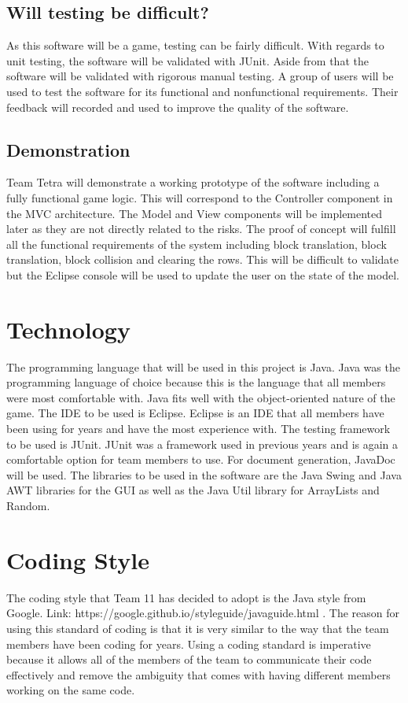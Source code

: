 \documentclass{article}
\begin{document}
\subsection{Will testing be difficult?}
As this software will be a game, testing can be fairly difficult. With regards to unit testing, the software will be validated with JUnit.  Aside from that the software will be validated with rigorous manual testing. A group of users will be used to test the software for its functional and nonfunctional requirements. Their feedback will recorded and used to improve the quality of the software.

\subsection{Demonstration}
Team Tetra will demonstrate a working prototype of the software including a fully functional game logic. This will correspond to the Controller component in the MVC architecture. The Model and View components will be implemented later as they are not directly related to the risks. The proof of concept will fulfill all the functional requirements of the system including block translation, block translation, block collision and clearing the rows. This will be difficult to validate but the Eclipse console will be used to update the user on the state of the model. 

\section{Technology}
The programming language that will be used in this project is Java. Java was the programming language of choice because this is the language that all members were most comfortable with. Java fits well with the object-oriented nature of the game. The IDE to be used is Eclipse. Eclipse is an IDE that all members have been using for  years and have the most experience with. The testing framework to be used is JUnit. JUnit was a framework used in previous years and is again a comfortable option for team members to use. For document generation, JavaDoc will be used. The libraries to be used in the software are the Java Swing and Java AWT libraries for the GUI as well as the Java Util library for ArrayLists and Random.
\section{Coding Style}
The coding style that Team 11 has decided to adopt is the Java style from Google. Link: https://google.github.io/styleguide/javaguide.html . The reason for using this standard of coding is that it is very similar to the way that the team members have been coding for years. Using a coding standard is imperative because it allows all of the members of the team to communicate their code effectively and remove the ambiguity that comes with having different members working on the same code.
\end{document}
